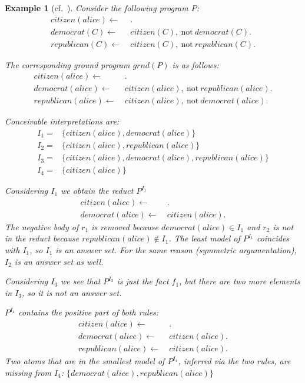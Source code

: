 \documentclass{vutinfth} %
\newtheorem{example}{Example}[chapter]
\newcommand{\fail}{\mathrm{not } \ \xspace}
\newcommand{\from}{\ensuremath{\leftarrow}}
\begin{document}
\begin{example}[{cf.~\cite[Example 16]{DBLP:conf/rweb/EiterIK09}}]
Consider the following program $P$:
\begin{align*}
citizen(alice)\from& \ .\\
democrat(C) \from& \ citizen(C),~\fail democrat(C).\\
republican(C) \from& \ citizen(C),~\fail republican(C).
\end{align*}

The corresponding ground program $grnd(P)$ is as follows:
\begin{align}
citizen(alice)\from& \ . \tag{$f_1$} \\
democrat(alice) \from& \ citizen(alice),~\fail republican(alice). \tag{$r_1$} \\
republican(alice) \from& \ citizen(alice),~\fail democrat(alice). \tag{$r_2$} 
\end{align}

Conceivable interpretations are:
\begin{align*}
I_1 =& \{ citizen(alice), democrat(alice) \}\\
I_2 =& \{ citizen(alice), republican(alice) \}\\
I_3 =& \{ citizen(alice), democrat(alice), republican(alice) \}\\
I_4 =& \{ citizen(alice) \}
\end{align*}

Considering $I_1$ we obtain the reduct $P^{I_1}$
\begin{align*}
citizen(alice)\from& \ .\\
democrat(alice) \from& \ citizen(alice).
\end{align*}
The negative body of $r_1$ is removed because $democrat(alice) \in I_1$ and $r_2$ is not in the reduct because $republican(alice) \not \in I_1$. The least model of $P^{I_1}$ coincides with $I_1$, so $I_1$ is an answer set. For the same reason (symmetric argumentation), $I_2$ is an answer set as well.

Considering $I_3$ we see that $P^{I_3}$ is just the fact $f_1$, but there are two more elements in $I_3$, so it is not an answer set.

$P^{I_4}$ contains the positive part of both rules:
\begin{align*}
citizen(alice)\from& \ . \\
democrat(alice) \from& \ citizen(alice). \\
republican(alice) \from& \ citizen(alice).
\end{align*}
Two atoms that are in the smallest model of $P^{I_4}$, inferred via the two rules, are missing from $I_4$: $\{democrat(alice), republican(alice) \}$
\end{example}
\end{document}
